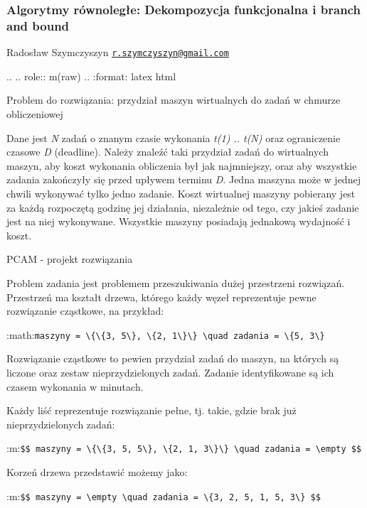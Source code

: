 \documentclass[ignorenonframetext,]{beamer}
\begin{document}
\begin{frame}[fragile]\frametitle{Algorytmy równoległe: Dekompozycja
funkcjonalna i branch and bound}

Radosław Szymczyszyn
\href{mailto:r.szymczyszyn@gmail.com}{\texttt{r.szymczyszyn@gmail.com}}

.. .. role:: m(raw) .. :format: latex html

\begin{block}{Problem do rozwiązania: przydział maszyn wirtualnych do
zadań w chmurze obliczeniowej}

Dane jest \emph{N} zadań o znanym czasie wykonania \emph{t(1) .. t(N)}
oraz ograniczenie czasowe \emph{D} (deadline). Należy znaleźć taki
przydział zadań do wirtualnych maszyn, aby koszt wykonania obliczenia
był jak najmniejszy, oraz aby wszystkie zadania zakończyły się przed
upływem terminu \emph{D}. Jedna maszyna może w jednej chwili wykonywać
tylko jedno zadanie. Koszt wirtualnej maszyny pobierany jest za każdą
rozpoczętą godzinę jej działania, niezależnie od tego, czy jakieś
zadanie jest na niej wykonywane. Wszystkie maszyny posiadają jednakową
wydajność i koszt.

\end{block}

\begin{block}{PCAM - projekt rozwiązania}

Problem zadania jest problemem przeszukiwania dużej przestrzeni
rozwiązań. Przestrzeń ma kształt drzewa, którego każdy węzeł
reprezentuje pewne rozwiązanie cząstkowe, na przykład:

:math:\texttt{maszyny = \textbackslash{}\{\textbackslash{}\{3, 5\textbackslash{}\}, \textbackslash{}\{2, 1\textbackslash{}\}\textbackslash{}\} \textbackslash{}quad zadania = \textbackslash{}\{5, 3\textbackslash{}\}}

Rozwiązanie cząstkowe to pewien przydział zadań do maszyn, na których są
liczone oraz zestaw nieprzydzielonych zadań. Zadanie identyfikowane są
ich czasem wykonania w minutach.

Każdy liść reprezentuje rozwiązanie pełne, tj. takie, gdzie brak już
nieprzydzielonych zadań:

:m:\texttt{\$\$ maszyny = \textbackslash{}\{\textbackslash{}\{3, 5, 5\textbackslash{}\}, \textbackslash{}\{2, 1, 3\textbackslash{}\}\textbackslash{}\} \textbackslash{}quad zadania = \textbackslash{}empty \$\$}

Korzeń drzewa przedstawić możemy jako:

:m:\texttt{\$\$ maszyny = \textbackslash{}empty \textbackslash{}quad zadania = \textbackslash{}\{3, 2, 5, 1, 5, 3\textbackslash{}\} \$\$}


\end{block}
\end{frame}
\end{document}
